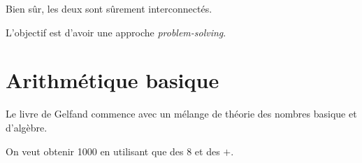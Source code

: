 \documentclass[fleqn,a4paper,nobib]{tufte-handout}
\begin{document}
Bien sûr, les deux sont sûrement interconnectés.

L'objectif est d'avoir une approche \textit{problem-solving}.

\section{Arithmétique basique}

Le livre de Gelfand commence avec un mélange de théorie des
nombres basique et d'algèbre.


\begin{exercise}
    On veut obtenir 1000 en utilisant que des 8 et des $+$.
\end{exercise}
\end{document}
